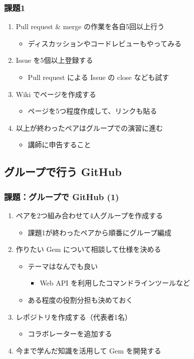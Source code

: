 \documentclass[a4paper,twoside,twocolumn]{bxjsarticle}
\begin{document}
\subsubsection{課題1}
\label{sec-4-1-2}
\begin{enumerate}
\item Pull request \& merge の作業を各自5回以上行う
\begin{itemize}
\item ディスカッションやコードレビューもやってみる
\end{itemize}
\item Issue を5個以上登録する
\begin{itemize}
\item Pull request による Issue の close なども試す
\end{itemize}
\item Wiki でページを作成する
\begin{itemize}
\item ページを5つ程度作成して、リンクも貼る
\end{itemize}
\item 以上が終わったペアはグループでの演習に進む
\begin{itemize}
\item 講師に申告すること
\end{itemize}
\end{enumerate}

\subsection{グループで行う GitHub}
\label{sec-4-2}
\subsubsection{課題：グループで GitHub (1)}
\label{sec-4-2-1}
\begin{enumerate}
\item ペアを2つ組み合わせて4人グループを作成する
\begin{itemize}
\item 課題1が終わったペアから順番にグループ編成
\end{itemize}
\item 作りたい Gem について相談して仕様を決める
\begin{itemize}
\item テーマはなんでも良い
\begin{itemize}
\item Web API を利用したコマンドラインツールなど
\end{itemize}
\item ある程度の役割分担も決めておく
\end{itemize}
\item レポジトリを作成する（代表者1名）
\begin{itemize}
\item コラボレーターを追加する
\end{itemize}
\item 今まで学んだ知識を活用して Gem を開発する
\end{enumerate}
\end{document}
